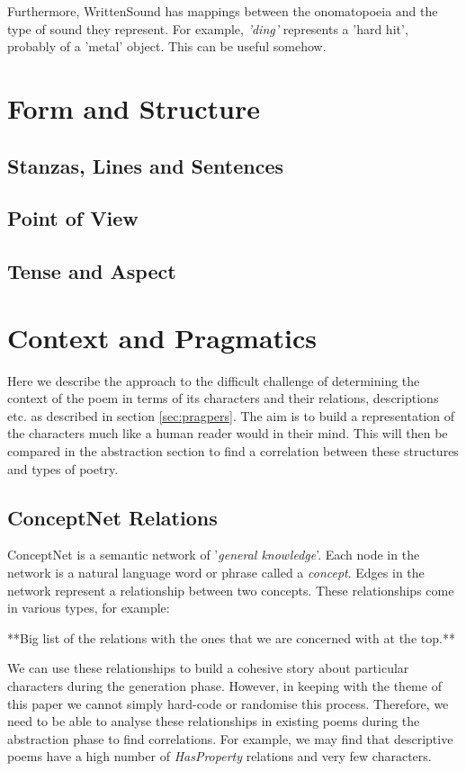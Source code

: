 Furthermore, WrittenSound has mappings between the onomatopoeia and the type of sound they represent. For example, \textit{'ding'} represents a 'hard hit', probably of a 'metal' object. This can be useful somehow.


\section{Form and Structure}



\subsection{Stanzas, Lines and Sentences}

\subsection{Point of View}

\subsection{Tense and Aspect}



\section{Context and Pragmatics}
Here we describe the approach to the difficult challenge of determining the context of the poem in terms of its characters and their relations, descriptions etc. as described in section \ref{sec:pragpers}. The aim is to build a representation of the characters much like a human reader would in their mind. This will then be compared in the abstraction section to find a correlation between these structures and types of poetry.

\subsection{ConceptNet Relations}
ConceptNet is a semantic network of '\textit{general knowledge}'. Each node in the network is a natural language word or phrase called a \textit{concept}. Edges in the network represent a relationship between two concepts. These relationships come in various types, for example:

**Big list of the relations with the ones that we are concerned with at the top.**

We can use these relationships to build a cohesive story about particular characters during the generation phase. However, in keeping with the theme of this paper we cannot simply hard-code or randomise this process. Therefore, we need to be able to analyse these relationships in existing poems during the abstraction phase to find correlations. For example, we may find that descriptive poems have a high number of \textit{HasProperty} relations and very few characters.  

